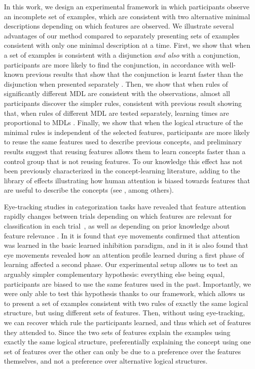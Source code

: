  In this work,  we  design  an experimental framework in which participants observe an incomplete set of examples, which are consistent with two alternative minimal descriptions depending on which features are observed.  We  illustrate  several advantages of our method compared to separately presenting sets of examples consistent with only one minimal description at a time. First, we  show  that when a set of examples is consistent with a disjunction \textit{and also} with a conjunction, participants are more likely to find the conjunction, in accordance with well-known previous results that show that the conjunction is learnt faster than the disjunction when presented separately \cite{bourne1970knowing}. Then, we  show  that when rules of significantly different MDL are consistent with the observations, almost all participants discover the simpler rules, consistent with previous result showing that, when rules of different MDL are tested separately, learning times are proportional to MDLs \cite{feldman2000minimization}. Finally, we  show  that when the logical structure of the minimal rules is independent of the selected features, participants are more likely to reuse the same features used to describe previous concepts,  and preliminary results suggest that reusing features  allows them to learn concepts faster than a control group that is not reusing features. To our knowledge this effect has not been previously characterized in the concept-learning literature, adding to the library of effects illustrating how human attention is biased towards features that are useful to describe the concepts (see \cite{blair2009extremely,kruschke2000blocking,kruschke2005eye,hoffman2010costs}, among others).


Eye-tracking studies in categorization tasks have revealed that feature attention rapidly changes between trials depending on which features are relevant for classification in each trial~\cite{blair2009extremely}, as well as depending on prior knowledge about feature relevance \cite{kim2011prior}. In \cite{kruschke2005eye} it is found that eye movements confirmed that attention was learned in the basic learned inhibition paradigm, and in \cite{hoffman2010costs} it is also found that eye movements revealed how an attention profile learned during a first phase of learning affected a second phase.  Our experimental setup allows us to test an arguably simpler complementary hypothesis: everything else being equal, participants are biased to use the same features used in the past.  Importantly, we were only able to test this hypothesis thanks to our framework, which allows us to present a set of examples consistent with two rules of exactly the same logical structure, but using different sets of features. Then, without using eye-tracking, we can recover which rule the participants learned, and thus which set of features they attended to. Since the two sets of features explain the examples using exactly the same logical structure, preferentially explaining the concept using one set of features over the other can only be due to a preference over the features themselves, and not a preference over alternative logical structures. 





